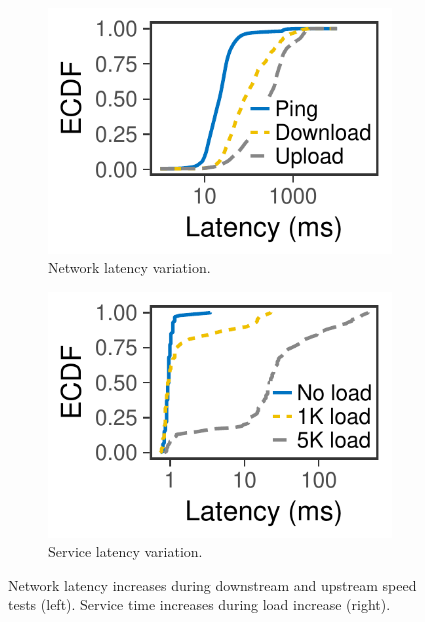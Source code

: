 \begin{figure}[t]
  \begin{subfigure}[t]{0.49\columnwidth}
    \centering
    \includegraphics[width=\textwidth]{figures/fcc_latency.pdf}
    \caption{Network latency variation.}
    \label{fig:fcc-latency}
  \end{subfigure}
  \hfill
  \begin{subfigure}[t]{0.49\columnwidth}
    \centering
    \includegraphics[width=\textwidth]{figures/tf_latency.pdf}
    \caption{Service latency variation.}
    \label{fig:tf-latency}
  \end{subfigure}
  \caption{Network latency increases during downstream and upstream speed tests
    (left). Service time increases during load increase (right).}
\end{figure}

